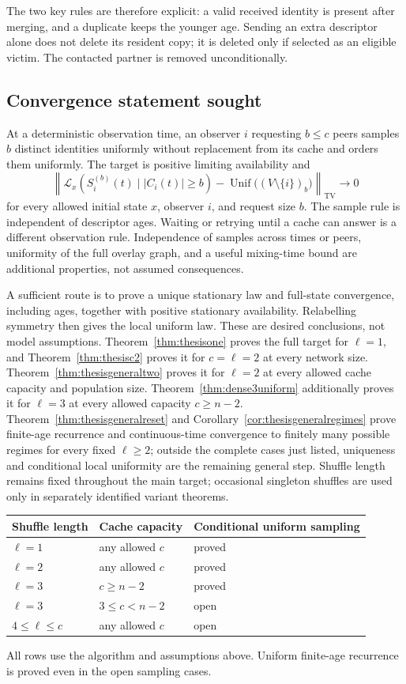 \documentclass[11pt]{article}
\newcommand{\TV}{\mathrm{TV}}
\newcommand{\Unif}{\operatorname{Unif}}
\newcommand{\Law}{\mathcal L}
\begin{document}
The two key rules are therefore explicit: a valid received
identity is present after merging, and a duplicate keeps the
younger age. Sending an extra descriptor alone does not delete
its resident copy; it is deleted only if selected as an eligible
victim. The contacted partner is removed unconditionally.

\subsection{Convergence statement sought}
At a deterministic observation time, an observer $i$ requesting
$b\le c$ peers samples $b$ distinct identities uniformly without
replacement from its cache and orders them uniformly.
The target is positive limiting availability and
\[
 \left\|\Law_x\!\left(S_i^{(b)}(t)\mid |C_i(t)|\ge b\right)
 -\Unif\bigl((V\setminus\{i\})_b\bigr)\right\|_{\TV}
 \longrightarrow0
\]
for every allowed initial state $x$, observer $i$, and request
size $b$. The sample rule is independent of descriptor ages.
Waiting or retrying until a cache can answer is a different
observation rule. Independence of samples across times or peers,
uniformity of the full overlay graph, and a useful mixing-time
bound are additional properties, not assumed consequences.

A sufficient route is to prove a unique stationary law and
full-state convergence, including ages, together with positive
stationary availability. Relabelling symmetry then gives the
local uniform law. These are desired conclusions, not model
assumptions. Theorem~\ref{thm:thesisone} proves the full target
for $\ell=1$, and Theorem~\ref{thm:thesisc2} proves it
for $c=\ell=2$ at every network size.
Theorem~\ref{thm:thesisgeneraltwo} proves it for $\ell=2$
at every allowed cache capacity and population size.
Theorem~\ref{thm:dense3uniform} additionally proves it for
$\ell=3$ at every allowed capacity $c\ge n-2$.
Theorem~\ref{thm:thesisgeneralreset} and
Corollary~\ref{cor:thesisgeneralregimes} prove finite-age
recurrence and continuous-time convergence to finitely many
possible regimes for every fixed $\ell\ge2$; outside
the complete cases just listed, uniqueness and conditional
local uniformity are the remaining general step.
Shuffle length remains fixed throughout
the main target; occasional singleton shuffles are used only
in separately identified variant theorems.

\begin{center}
\begin{tabular}{lll}
\toprule
Shuffle length & Cache capacity & Conditional uniform sampling\\
\midrule
$\ell=1$ & any allowed $c$ & proved\\
$\ell=2$ & any allowed $c$ & proved\\
$\ell=3$ & $c\ge n-2$ & proved\\
$\ell=3$ & $3\le c<n-2$ & open\\
$4\le\ell\le c$ & any allowed $c$ & open\\
\bottomrule
\end{tabular}
\end{center}
All rows use the algorithm and assumptions above. Uniform
finite-age recurrence is proved even in the open sampling cases.
\end{document}
